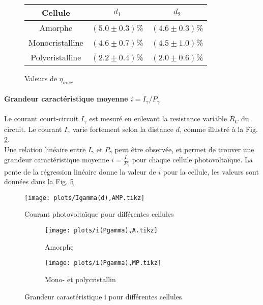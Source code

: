 \begin{figure}
    \centering
    \begin{tabulary}{0.7\linewidth}{C C C}
        \toprule
        Cellule & \(d_1\) & \(d_2\) \\
        \midrule
        Amorphe & \((5.0 \pm 0.3)\)\% & \((4.6 \pm 0.3)\)\% \\
        Monocristalline & \((4.6 \pm 0.7)\)\% & \((4.5 \pm 1.0)\)\% \\
        Polycristalline & \((2.2 \pm 0.4)\)\% & \((2.0 \pm 0.6)\)\% \\
        \bottomrule
    \end{tabulary}
    \caption{Valeurs de \(\eta_{max}\)}
    \label{tab:rendementmax}
\end{figure}


\paragraph*{Grandeur caractéristique moyenne \(i = I_\gamma/P_\gamma\)}
Le courant court-circuit \(I_\gamma\) est mesuré en enlevant la resistance variable \(R_C\) du circuit. Le courant \(I_\gamma\) varie fortement selon la distance \(d\), comme illustré à la Fig. \ref{plot:4}. \\
Une relation linéaire entre \(I_\gamma\) et \(P_\gamma\) peut être observée, et permet de trouver une grandeur caractéristique moyenne \(i = \frac{I_\gamma}{P_\gamma}\) pour chaque cellule photovoltaïque. La pente de la régression linéaire donne la valeur de \(i\) pour la cellule, les valeurs sont données dans la Fig. \ref{plot:5}

\begin{figure}
    \centering
    \texttt{[image: plots/Igamma(d),AMP.tikz]}
    \caption{Courant photovoltaïque pour différentes cellules}
    \label{plot:4}
\end{figure}

\begin{figure}
    \centering
    \begin{subfigure}[t]{0.45\linewidth}
        \centering
        \texttt{[image: plots/i(Pgamma),A.tikz]}
        \caption{Amorphe}
        \label{plot:5a}
    \end{subfigure}
    \begin{subfigure}[t]{0.45\linewidth}
        \centering
        \texttt{[image: plots/i(Pgamma),MP.tikz]}
        \caption{Mono- et polycristallin}
        \label{plot:5b}
    \end{subfigure}
    \caption{Grandeur caractéristique i pour différentes cellules}
    \label{plot:5}
\end{figure}

